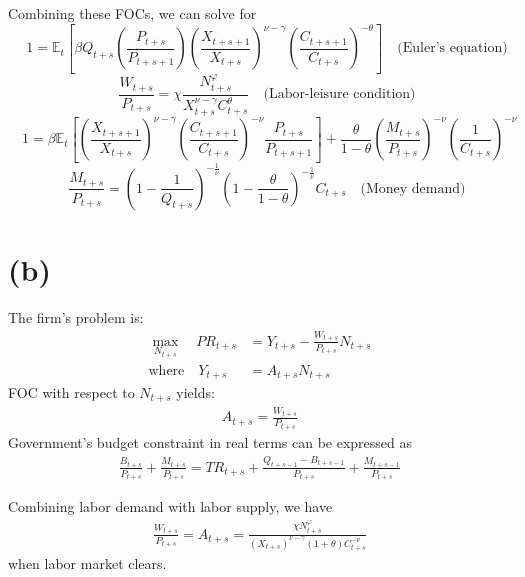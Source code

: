 \documentclass[12pt]{article}
\begin{document}
Combining these FOCs, we can solve for 
\begin{equation}\label{eq:ee}
\quad 1 = \mathbb{E}_t \left[ 
\beta Q_{t+s} \left(\frac{P_{t+s}}{P_{t+s+1}} \right) 
\left(\frac{X_{t+s+1}}{X_{t+s}} \right)^{\nu-\gamma}
\left(\frac{C_{t+s+1}}{C_{t+s}} \right)^{-\theta} 
\right] \quad 
\text{(Euler's equation)}
\end{equation}
\begin{equation}\label{eq:ll}
\quad \frac{W_{t+s}}{P_{t+s}} = \chi \frac{N_{t+s}^{\varphi}}{X_{t+s}^{\nu-\gamma}C_{t+s}^{\theta}} \quad 
\text{(Labor-leisure condition)}
\end{equation}
\begin{equation}\label{eq:cm}
\quad 1 = \beta \mathbb{E}_t \left[ \left( \frac{X_{t+s+1}}{X_{t+s}} \right)^{\nu-\gamma} \left( \frac{C_{t+s+1}}{C_{t+s}} \right)^{-\nu} \frac{P_{t+s}}{P_{t+s+1}}\right] + 
\frac{\theta}{1-\theta}\left(\frac{M_{t+s}}{P_{t+s}}\right)^{-\nu}\left(\frac{1}{C_{t+s}}\right)^{-\nu}
\end{equation}
\begin{equation}\label{eq:md}
\quad \frac{M_{t+s}}{P_{t+s}} = \left( 1 - \frac{1}{Q_{t+s}} \right)^{-\frac{1}{\nu}}
\left( 1 - \frac{\theta}{1-\theta} \right)^{-\frac{1}{\nu}} C_{t+s} \quad 
\text{(Money demand)}
\end{equation}

\section*{(b)}

The firm's problem is:
\begin{align*}
\max_{N_{t+s}} \quad PR_{t+s} &= Y_{t+s} - \frac{W_{t+s}}{P_{t+s}} N_{t+s} \\
\text{where} \quad Y_{t+s} &= A_{t+s} N_{t+s}
\end{align*}
FOC with respect to $N_{t+s}$ yields:
\begin{align*}
A_{t+s} = \frac{W_{t+s}}{P_{t+s}}
\end{align*}
Government's budget constraint in real terms can be expressed as
\begin{align*}
\frac{B_{t+s}}{P_{t+s}} + \frac{M_{t+s}}{P_{t+s}} = TR_{t+s} + \frac{Q_{t+s-1} - B_{t+s-1}}{P_{t+s}} + \frac{M_{t+s-1}}{P_{t+s}}
\end{align*}


Combining labor demand with labor supply, we have
\begin{align*}
\frac{W_{t+s}}{P_{t+s}} 
= A_{t+s}
= \frac{\chi N_{t+s}^{\varphi}}{(X_{t+s})^{\nu - \gamma} (1+\theta) C_{t+s}^{-\nu}}
\end{align*}
when labor market clears.
\end{document}
